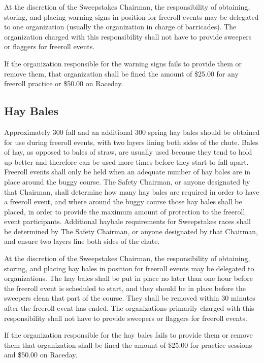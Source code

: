 	At the discretion of the Sweepstakes Chairman, the responsibility of obtaining,
	storing, and placing warning signs in position for freeroll events may be
	delegated to one organization (usually the organization in charge of
	barricades). The organization charged with this responsibility shall not have
	to provide sweepers or flaggers for freeroll events.

	If the organization responsible for the warning signs fails to provide them or
	remove them, that organization shall be fined the amount of \$25.00 for any 
	freeroll practice or \$50.00 on Raceday.
	
	
\subsection{Hay Bales}

	Approximately 300 fall and an additional 300 spring hay bales should be 
	obtained for use during freeroll events, with two layers lining both sides 
	of the chute. Bales of hay, as opposed to bales of straw, are usually used 
	because they tend to hold up better and therefore can be used more times before 
	they start to fall apart. Freeroll events shall only be held when an adequate 
	number of hay bales are in place around the buggy course. The Safety Chairman, 
	or anyone designated by that Chairman, shall determine how many hay bales are 
	required in order to have a freeroll event, and where around the buggy course 
	those hay bales shall be placed, in order to provide the maximum amount of 
	protection to the freeroll event participants. Additional haybale requirements 
	for Sweepstakes races shall be determined by The Safety Chairman, or anyone 
	designated by that Chairman, and ensure two layers line both sides of the chute.

	At the discretion of the Sweepstakes Chairman, the responsibility of obtaining,
	storing, and placing hay bales in position for freeroll events may be
	delegated to organizations. The hay bales shall be put in place no later
	than one hour before the freeroll event is scheduled to start, and they
	should be in place before the sweepers clean that part of the course. They
	shall be removed within 30 minutes after the freeroll event has ended. The
	organizations primarily charged with this responsibility shall not have to 
	provide sweepers or flaggers for freeroll events.

	If the organization responsible for the hay bales fails to provide them or
	remove them that organization shall be fined the amount of \$25.00 for 
	practice sessions and \$50.00 on Raceday.
	

